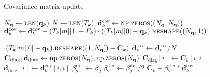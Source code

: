 \begin{algorithm}[H]%
\caption{\label{updateCovAlg}Covariance matrix update}
\begin{algorithmic}[1]
\State $N_\mathbf{q}\gets \Call{len}{\mathbf{q}_k}$
\State $N\gets \Call{len}{T_k}$
\State $\mathbf{d}^\mathrm{cov}_k \gets \Call{np.zeros}{(N_\mathbf{q}, N_\mathbf{q})}$
\State $\mathbf{d}^\mathrm{cov}_k \gets \mathbf{d}^\mathrm{cov}_k + (T_k[m][1]-F_k)\cdot((T_k[m][0]-\mathbf{q}_k).\Call{reshape}{(N_\mathbf{q},1)}$\par$\cdot(T_k[m][0]-\mathbf{q}_k).\Call{reshape}{(1,N_\mathbf{q})}-\mathbf{C}_k)$
\EndFor
\State $\mathbf{d}^\mathrm{cov}_k \gets \mathbf{d}^\mathrm{cov}_k/N$
\State \label{CDiagDDiagBegin} $\mathbf{C}_\mathrm{diag}, \mathbf{d}_\mathrm{diag}\gets\mathrm{np.}\Call{zeros}{N_\mathbf{q}}, \mathrm{np.}\Call{zeros}{N_\mathbf{q}}$
\State $\mathbf{C}_\mathrm{diag}[i]\gets\mathbf{C}_k[i, i]$
\State \label{CDiagDDiagEnd}$\mathbf{d}_\mathrm{diag}[i]\gets\mathbf{d}^\mathrm{cov}_k[i, i]$
\EndFor
\State $\beta^\mathrm{iter}_2\gets\beta_2$
\State $\beta^\mathrm{iter}_2 \gets \beta^\mathrm{iter}_2/2$
\EndWhile
\State \Return $\mathbf{C}_k+\beta^\mathrm{iter}_2*\mathbf{d}^\mathrm{cov}_k$
\EndFunction
\end{algorithmic}
\end{algorithm}

